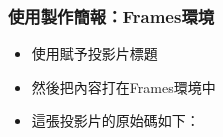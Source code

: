 \begin{frame}
\frametitle{使用製作簡報：Frames環境}
\begin{itemize}
\item 使用賦予投影片標題
\item 然後把內容打在Frames環境中
\item 這張投影片的原始碼如下：
\end{itemize}
\end{frame}


